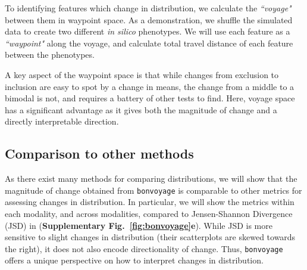 To identifying features which change in distribution, we calculate the \emph{``voyage"} between them in waypoint space. As a demonstration, we shuffle the simulated data to create two different \emph{in silico} phenotypes. We will use each feature as a \emph{``waypoint"} along the voyage, and calculate total travel distance of each feature between the phenotypes. 


A key aspect of the waypoint space is that while changes from exclusion to inclusion are easy to spot by a change in means, the change from a middle to a bimodal is not, and requires a battery of other tests to find. Here, voyage space has a significant advantage as it gives both the magnitude of change and a directly interpretable direction. 


\subsection{Comparison to other methods}

As there exist many methods for comparing distributions, we will show that the magnitude of change obtained from \texttt{bonvoyage} is comparable to other metrics for assessing changes in distribution. In particular, we will show the metrics within each modality, and across modalities, compared to Jensen-Shannon Divergence\cite{Anonymous:2011vn} (JSD) in (\textbf{Supplementary Fig.~\ref{fig:bonvoyage}e}). While JSD is more sensitive to slight changes in distribution (their scatterplots are skewed towards the right), it does not also encode directionality of change. Thus, \texttt{bonvoyage} offers a unique perspective on how to interpret changes in distribution.










